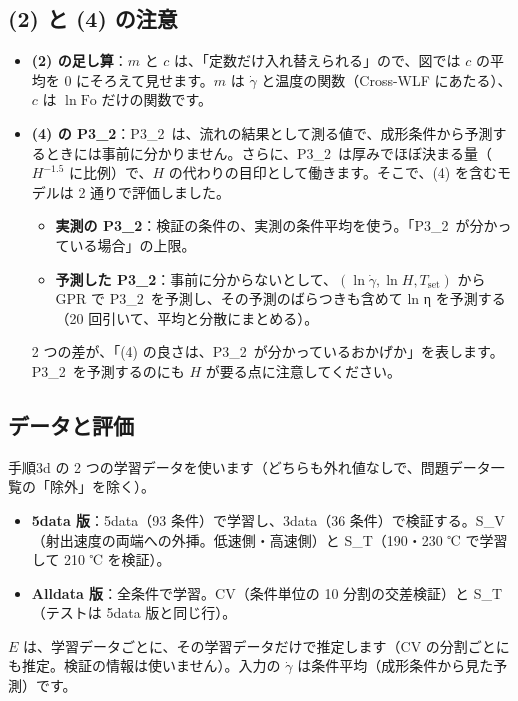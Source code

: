\documentclass[paper=a4paper,fontsize=10.5pt,line_length=44zw,number_of_lines=38]{jlreq}
\newcommand{\gd}{\dot{\gamma}}
\newcommand{\Tset}{T_{\mathrm{set}}}
\newcommand{\PII}{P3\_2}
\newenvironment{points}{\begin{itemize}[label=$\triangleright$,leftmargin=1.5\zw,itemsep=0.3ex,topsep=0.5ex,parsep=0pt]}{\end{itemize}}
\newcommand{\pt}[1]{\item \textbf{#1}：}
\begin{document}
\subsection{(2) と (4) の注意}
\begin{points}
\pt{(2) の足し算}$m$ と $c$ は、「定数だけ入れ替えられる」ので、図では $c$ の平均を 0 にそろえて見せます。$m$ は $\gd$ と温度の関数（Cross-WLF にあたる）、$c$ は $\ln\mathrm{Fo}$ だけの関数です。
\pt{(4) の P3\_2}\PII\ は、流れの結果として測る値で、成形条件から予測するときには事前に分かりません。さらに、\PII\ は厚みでほぼ決まる量（$H^{-1.5}$ に比例）で、$H$ の代わりの目印として働きます。そこで、(4) を含むモデルは 2 通りで評価しました。
\begin{itemize}[itemsep=0.2ex,topsep=0.3ex]
\item \textbf{実測の \PII}：検証の条件の、実測の条件平均を使う。「\PII\ が分かっている場合」の上限。
\item \textbf{予測した \PII}：事前に分からないとして、$(\ln\gd,\ln H,\Tset)$ から GPR で \PII\ を予測し、その予測のばらつきも含めて ln η を予測する（20 回引いて、平均と分散にまとめる）。
\end{itemize}
2 つの差が、「(4) の良さは、\PII\ が分かっているおかげか」を表します。\PII\ を予測するのにも $H$ が要る点に注意してください。
\end{points}

\subsection{データと評価}
手順3d の 2 つの学習データを使います（どちらも外れ値なしで、問題データ一覧の「除外」を除く）。
\begin{itemize}[itemsep=0.2ex,topsep=0.3ex]
\item \textbf{5data 版}：5data（93 条件）で学習し、3data（36 条件）で検証する。S\_V（射出速度の両端への外挿。低速側・高速側）と S\_T（190・230 ℃ で学習して 210 ℃ を検証）。
\item \textbf{Alldata 版}：全条件で学習。CV（条件単位の 10 分割の交差検証）と S\_T（テストは 5data 版と同じ行）。
\end{itemize}
$E$ は、学習データごとに、その学習データだけで推定します（CV の分割ごとにも推定。検証の情報は使いません）。入力の $\gd$ は条件平均（成形条件から見た予測）です。

\end{document}
